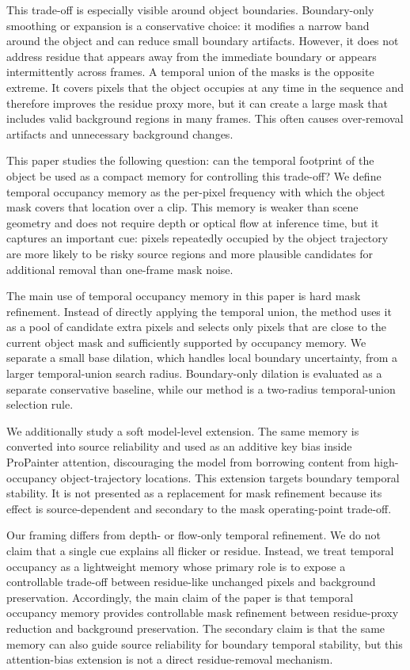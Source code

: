 \documentclass[nouppercase]{kaia}
\begin{document}
This trade-off is especially visible around object boundaries. Boundary-only smoothing or expansion is a conservative choice: it modifies a narrow band around the object and can reduce small boundary artifacts. However, it does not address residue that appears away from the immediate boundary or appears intermittently across frames. A temporal union of the masks is the opposite extreme. It covers pixels that the object occupies at any time in the sequence and therefore improves the residue proxy more, but it can create a large mask that includes valid background regions in many frames. This often causes over-removal artifacts and unnecessary background changes.

This paper studies the following question: can the temporal footprint of the object be used as a compact memory for controlling this trade-off? We define temporal occupancy memory as the per-pixel frequency with which the object mask covers that location over a clip. This memory is weaker than scene geometry and does not require depth or optical flow at inference time, but it captures an important cue: pixels repeatedly occupied by the object trajectory are more likely to be risky source regions and more plausible candidates for additional removal than one-frame mask noise.

The main use of temporal occupancy memory in this paper is hard mask refinement. Instead of directly applying the temporal union, the method uses it as a pool of candidate extra pixels and selects only pixels that are close to the current object mask and sufficiently supported by occupancy memory. We separate a small base dilation, which handles local boundary uncertainty, from a larger temporal-union search radius. Boundary-only dilation is evaluated as a separate conservative baseline, while our method is a two-radius temporal-union selection rule.

We additionally study a soft model-level extension. The same memory is converted into source reliability and used as an additive key bias inside ProPainter attention, discouraging the model from borrowing content from high-occupancy object-trajectory locations. This extension targets boundary temporal stability. It is not presented as a replacement for mask refinement because its effect is source-dependent and secondary to the mask operating-point trade-off.

Our framing differs from depth- or flow-only temporal refinement. We do not claim that a single cue explains all flicker or residue. Instead, we treat temporal occupancy as a lightweight memory whose primary role is to expose a controllable trade-off between residue-like unchanged pixels and background preservation. Accordingly, the main claim of the paper is that temporal occupancy memory provides controllable mask refinement between residue-proxy reduction and background preservation. The secondary claim is that the same memory can also guide source reliability for boundary temporal stability, but this attention-bias extension is not a direct residue-removal mechanism.
\end{document}
